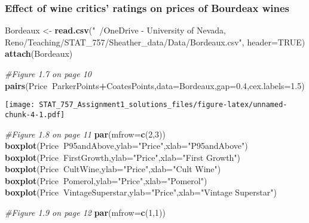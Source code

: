\documentclass[]{article}
\newenvironment{Shaded}{\begin{snugshade}}{\end{snugshade}}
\newcommand{\CommentTok}[1]{\textcolor[rgb]{0.56,0.35,0.01}{\textit{#1}}}
\newcommand{\DataTypeTok}[1]{\textcolor[rgb]{0.13,0.29,0.53}{#1}}
\newcommand{\DecValTok}[1]{\textcolor[rgb]{0.00,0.00,0.81}{#1}}
\newcommand{\FloatTok}[1]{\textcolor[rgb]{0.00,0.00,0.81}{#1}}
\newcommand{\KeywordTok}[1]{\textcolor[rgb]{0.13,0.29,0.53}{\textbf{#1}}}
\newcommand{\NormalTok}[1]{#1}
\newcommand{\OperatorTok}[1]{\textcolor[rgb]{0.81,0.36,0.00}{\textbf{#1}}}
\newcommand{\OtherTok}[1]{\textcolor[rgb]{0.56,0.35,0.01}{#1}}
\newcommand{\StringTok}[1]{\textcolor[rgb]{0.31,0.60,0.02}{#1}}
\begin{document}
\hypertarget{effect-of-wine-critics-ratings-on-prices-of-bourdeax-wines}{%
\subsubsection{Effect of wine critics' ratings on prices of Bourdeax
wines}\label{effect-of-wine-critics-ratings-on-prices-of-bourdeax-wines}}

\begin{Shaded}
\begin{Highlighting}[]
\NormalTok{Bordeaux <-}\StringTok{ }\KeywordTok{read.csv}\NormalTok{(}\StringTok{"~/OneDrive - University of Nevada, Reno/Teaching/STAT_757/Sheather_data/Data/Bordeaux.csv"}\NormalTok{, }\DataTypeTok{header=}\OtherTok{TRUE}\NormalTok{)}
\KeywordTok{attach}\NormalTok{(Bordeaux)}

\CommentTok{#Figure 1.7 on page 10}
\KeywordTok{pairs}\NormalTok{(Price}\OperatorTok{~}\NormalTok{ParkerPoints}\OperatorTok{+}\NormalTok{CoatesPoints,}\DataTypeTok{data=}\NormalTok{Bordeaux,}\DataTypeTok{gap=}\FloatTok{0.4}\NormalTok{,}\DataTypeTok{cex.labels=}\FloatTok{1.5}\NormalTok{)}
\end{Highlighting}
\end{Shaded}

\texttt{[image: STAT\_757\_Assignment1\_solutions\_files/figure-latex/unnamed-chunk-4-1.pdf]}

\begin{Shaded}
\begin{Highlighting}[]
\CommentTok{#Figure 1.8 on page 11}
\KeywordTok{par}\NormalTok{(}\DataTypeTok{mfrow=}\KeywordTok{c}\NormalTok{(}\DecValTok{2}\NormalTok{,}\DecValTok{3}\NormalTok{))}
\KeywordTok{boxplot}\NormalTok{(Price}\OperatorTok{~}\NormalTok{P95andAbove,}\DataTypeTok{ylab=}\StringTok{"Price"}\NormalTok{,}\DataTypeTok{xlab=}\StringTok{"P95andAbove"}\NormalTok{)}
\KeywordTok{boxplot}\NormalTok{(Price}\OperatorTok{~}\NormalTok{FirstGrowth,}\DataTypeTok{ylab=}\StringTok{"Price"}\NormalTok{,}\DataTypeTok{xlab=}\StringTok{"First Growth"}\NormalTok{)}
\KeywordTok{boxplot}\NormalTok{(Price}\OperatorTok{~}\NormalTok{CultWine,}\DataTypeTok{ylab=}\StringTok{"Price"}\NormalTok{,}\DataTypeTok{xlab=}\StringTok{"Cult Wine"}\NormalTok{)}
\KeywordTok{boxplot}\NormalTok{(Price}\OperatorTok{~}\NormalTok{Pomerol,}\DataTypeTok{ylab=}\StringTok{"Price"}\NormalTok{,}\DataTypeTok{xlab=}\StringTok{"Pomerol"}\NormalTok{)}
\KeywordTok{boxplot}\NormalTok{(Price}\OperatorTok{~}\NormalTok{VintageSuperstar,}\DataTypeTok{ylab=}\StringTok{"Price"}\NormalTok{,}\DataTypeTok{xlab=}\StringTok{"Vintage Superstar"}\NormalTok{)}

\CommentTok{#Figure 1.9 on page 12}
\KeywordTok{par}\NormalTok{(}\DataTypeTok{mfrow=}\KeywordTok{c}\NormalTok{(}\DecValTok{1}\NormalTok{,}\DecValTok{1}\NormalTok{))}
\end{Highlighting}
\end{Shaded}
\end{document}

